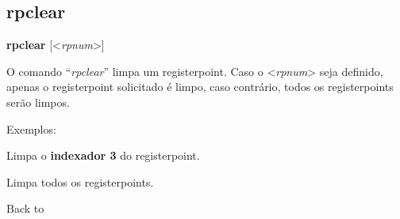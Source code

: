 \documentclass[letterpaper,10pt,brazil]{sphinxmanual}
\begin{document}
\begin{quote}
\label{debugger/registerpoints:debugger-command-rpclear}\end{quote}


\subsection{rpclear}
\label{debugger/registerpoints:debugger-command-rpclear}\label{debugger/registerpoints:rpclear}
\begin{DUlineblock}{0em}
\item[]
\begin{DUlineblock}{\DUlineblockindent}
\item[] \textbf{rpclear} {[}\textless{}\emph{rpnum}\textgreater{}{]}
\item[] 
\end{DUlineblock}
\item[] O comando ``\emph{rpclear}'' limpa um registerpoint. Caso o \textless{}\emph{rpnum}\textgreater{} seja definido, apenas o registerpoint solicitado é limpo, caso contrário, todos os registerpoints serão limpos.
\item[] 
\item[] Exemplos:
\item[] 
\item[]
\begin{DUlineblock}{\DUlineblockindent}
\item[] 
\item[] 
\end{DUlineblock}
\item[] Limpa o \textbf{indexador 3} do registerpoint.
\item[] 
\item[]
\begin{DUlineblock}{\DUlineblockindent}
\item[] 
\item[] 
\end{DUlineblock}
\item[] Limpa todos os registerpoints.
\item[] 
\item[] Back to {\hyperref[debugger/registerpoints:debugger\string-registerpoints\string-list]{}}
\end{DUlineblock}
\begin{quote}
\label{debugger/registerpoints:debugger-command-rpdisable}\end{quote}
\end{document}
